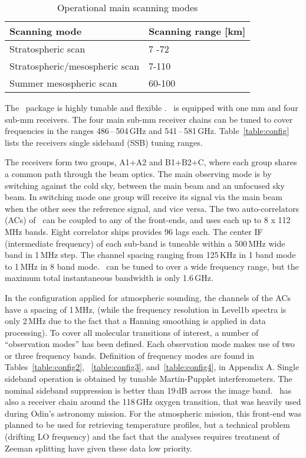 \begin{table}
\caption{Operational main scanning modes}
\label{table:scanpattern}
\begin{tabular}{|l|l|}
  \hline
  \textbf{Scanning mode} & \textbf{Scanning range {[}km{]}} \\
  \hline
  Stratospheric scan     &  7 -72 \\
 \hline
 Stratospheric/mesospheric scan &  7-110  \\
 \hline
 Summer mesospheric scan & 60-100 \\
 \hline
\end{tabular}
\end{table}



The \smr\ package is highly tunable and flexible \citep{frisk:theod:03}.
\smr\ is equipped with one mm and four sub-mm receivers.
The four main sub-mm receiver chains can be tuned to cover
frequencies in the ranges 486\,--\,504\,GHz and 541\,--\,581\,GHz.
Table~\ref{table:config} lists the receivers single sideband (SSB) tuning ranges.


The receivers form two groups, A1+A2 and B1+B2+C, where each group shares
a common path through the beam optics. 
The main observing mode is by switching against the cold sky, between the
main beam and an unfocused sky beam. In switching mode one group will
receive its signal via the main beam when the other sees the reference signal,
and vice versa.
The two auto-correlators (ACs) of \smr\ can be coupled to any of the front-ends,
and uses each up to 8 x 112 MHz bands.
Eight correlator ships provides 96 lags each.
The center IF (intermediate frequency) of each sub-band is tuneable
within a 500\,MHz wide band in 1\,MHz step. The channel spacing
ranging from 125\,KHz in 1 band mode to 1\,MHz in 8 band mode.
\smr\ can be tuned to over a wide frequency range, but the maximum total instantaneous
bandwidth is only 1.6\,GHz. 

In the configuration applied for
atmospheric sounding, the channels of the ACs have a spacing of 1\,MHz,
(while the frequency resolution in Level1b spectra is only 2\,MHz 
due to the fact that a Hanning smoothing is applied in data processing).
To cover all molecular transitions of interest, a 
number of ``observation modes'' has been defined. Each observation mode makes
use of two or three frequency bands. 
Definition of frequency modes are found in Tables~\ref{table:config2}, 
~\ref{table:config3}, and~\ref{table:config4}, in Appendix A.
Single sideband operation is obtained by tunable Martin-Pupplet
interferometers. The nominal sideband suppression is better than 19\,dB across
the image band.
\smr\ has also a receiver chain around the 118\,GHz oxygen transition, that was
heavily used during Odin's astronomy mission. For the atmospheric mission, this
front-end was planned to be used for retrieving temperature profiles, but a
technical problem (drifting LO frequency) and the fact that the analyses
requires treatment of Zeeman splitting have given these data low priority. 

